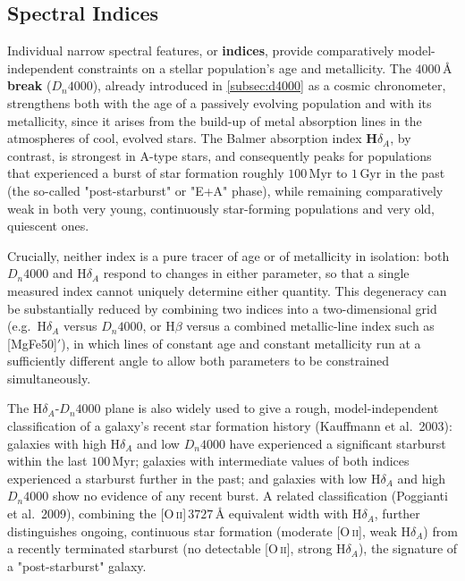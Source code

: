 \subsection{Spectral Indices} \label{subsec:d4000_galaxy}

Individual narrow spectral features, or \textbf{indices}, provide comparatively model-independent constraints on a stellar population's age and metallicity. The \textbf{$4000\,\text{\AA}$ break} ($D_n4000$), already introduced in \cref{subsec:d4000} as a cosmic chronometer, strengthens both with the age of a passively evolving population and with its metallicity, since it arises from the build-up of metal absorption lines in the atmospheres of cool, evolved stars. The Balmer absorption index \textbf{H$\delta_A$}, by contrast, is strongest in A-type stars, and consequently peaks for populations that experienced a burst of star formation roughly $100\,\text{Myr}$ to $1\,\text{Gyr}$ in the past (the so-called "post-starburst" or "E+A" phase), while remaining comparatively weak in both very young, continuously star-forming populations and very old, quiescent ones.

\medskip

Crucially, neither index is a pure tracer of age or of metallicity in isolation: both $D_n4000$ and $\text{H}\delta_A$ respond to changes in either parameter, so that a single measured index cannot uniquely determine either quantity. This degeneracy can be substantially reduced by combining two indices into a two-dimensional grid (e.g.\ $\text{H}\delta_A$ versus $D_n4000$, or $\text{H}\beta$ versus a combined metallic-line index such as [MgFe50]$'$), in which lines of constant age and constant metallicity run at a sufficiently different angle to allow both parameters to be constrained simultaneously.

\medskip

The $\text{H}\delta_A$-$D_n4000$ plane is also widely used to give a rough, model-independent classification of a galaxy's recent star formation history (Kauffmann et al.\ 2003): galaxies with high $\text{H}\delta_A$ and low $D_n4000$ have experienced a significant starburst within the last $100\,\text{Myr}$; galaxies with intermediate values of both indices experienced a starburst further in the past; and galaxies with low $\text{H}\delta_A$ and high $D_n4000$ show no evidence of any recent burst. A related classification (Poggianti et al.\ 2009), combining the [O\,\textsc{ii}]$\,3727\,\text{\AA}$ equivalent width with $\text{H}\delta_A$, further distinguishes ongoing, continuous star formation (moderate [O\,\textsc{ii}], weak $\text{H}\delta_A$) from a recently terminated starburst (no detectable [O\,\textsc{ii}], strong $\text{H}\delta_A$), the signature of a "post-starburst" galaxy.

